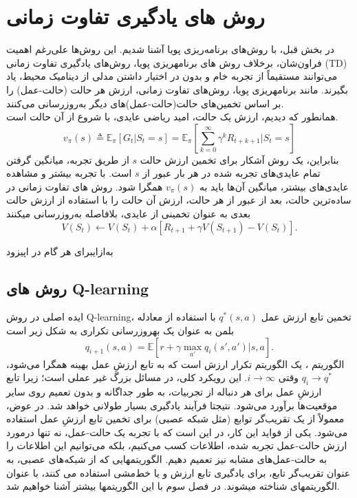 \section{روش های یادگیری تفاوت زمانی}
در بخش قبل، با روش‌های برنامه‌ریزی پویا آشنا شدیم. این روش‌ها علی‌رغم اهمیت فراون‌شان،
برخلاف روش های برنامه\nf ریزی پویا، روش‌های 
{یادگیری تفاوت زمانی} (TD) می‌توانند مستقیماً از تجربه خام و بدون در اختیار داشتن مدلی از دینامیک محیط، یاد بگیرند. مانند برنامه\nf ریزی پویا، روش‌های تفاوت زمانی، ارزش‌ هر حالت (حالت-عمل) را بر اساس تخمین‌های حالت‌(حالت-عمل)‌های دیگر به‌روزرسانی می‌کنند.
\\همانطور که دیدیم، ارزش یک حالت، امید ریاضی عایدی، با شروع از آن حالت است.
$$v_\pi(s) \triangleq \mathbb{E}_\pi\left[G_t| S_t=s\right] = \mathbb{E}_\pi\left[\sum_{k=0}^{\infty} \gamma^k R_{t+k+1}|S_t =s \right]$$
بنابراین، یک روش آشکار برای تخمین ارزش حالت $s$ از طریق تجربه، میانگین گرفتن تمام عایدی‌های تجربه شده در هر بار عبور از $s$ است.
با تجربه بیشتر و مشاهده عایدی‌های بیشتر، میانگین آن‌ها باید به $v_\pi(s)$ همگرا شود.
روش های تفاوت زمانی در ساده‌ترین حالت، بعد از عبور از هر حالت، ارزش آن حالت را با استفاده از ارزش حالت بعدی به عنوان تخمینی از عایدی، بلافاصله به‌روزرسانی می\nf کنند
$$V(S_t) \longleftarrow V(S_t) + \alpha\left[R_{t+1} + \gamma V(S_{t+1}) - V(S_t)\right].$$

\‌به‌ازای{برای هر گام در اپیزود}
\subsection{روش های Q-learning}
ایده اصلی در روش 
Q-learning،
 تخمین تابع ارزش عمل  
$q^*(s,a)$ 
با استفاده از معادله بلمن به عنوان یک به\nf روزرسانی تکراری به شکل زیر است
\cite{mnih2013playing}
$$q_{i+1}(s,a) = \mathbb{E}[r+ \gamma \max_{a'} q_i(s',a')|s,a].$$
الگوریتم 
،
یک الگوریتم تکرار ارزش است که به تابع ارزشِ عمل بهینه همگرا می‌شود، 
$q_i \longrightarrow q^*$
وقتی
$i \longrightarrow \infty$.
این رویکرد کلی، در مسائل بزرگ غیر عملی است؛
زیرا تابع ارزشِ عمل برای هر دنباله از تجربیات،  به طور جداگانه و بدون تعمیم روی سایر موقعیت‌ها برآورد می‌شود. نتیجتا فرآیند یادگیری بسیار طولانی خواهد شد. در عوض، معمولاً از یک تقریب‌گر توابع (مثل شبکه عصبی) برای تخمین تابع ارزشِ عمل استفاده می‌شود.  یکی از فواید این کار، در این است که با تجربه یک حالت-عمل، نه تنها درمورد ارزش حالت-عمل تجربه شده، اطلاعات کسب می‌کنیم، بلکه می‌توانیم این اطلاعات را به حالت-عمل‌های مشابه نیز تعمیم دهیم.
الگوریتم\nf هایی که از شبکه‌های عصبی، به عنوان تقریب‌گر تابع، برای یادگیری تابع ارزش و یا خط‌مشی استفاده می کنند، با عنوان الگوریتم\nf های 
\textit{}
شناخته می\nf شوند. در فصل سوم با این الگوریتم\nf ها بیشتر آشنا خواهیم شد.